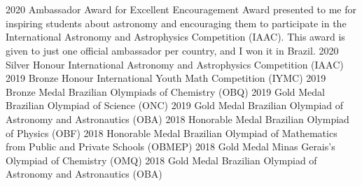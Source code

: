 \documentclass{cv}
\begin{document}
    \section*{}
        \begin{entrylist}
            \entry
                {2020}
                {Ambassador Award for Excellent Encouragement}
                {}
                {Award presented to me for inspiring students about astronomy and encouraging them to participate in the International Astronomy and Astrophysics Competition (IAAC). This award is given to just one official ambassador per country, and I won it in Brazil.}
            \entry
                {2020}
                {Silver Honour}
                {}
                {International Astronomy and Astrophysics Competition (IAAC)}
            \entry
                {2019}
                {Bronze Honour}
                {}
                {International Youth Math Competition (IYMC)}
            \entry
                {2019}
                {Bronze Medal}
                {}
                {Brazilian Olympiads of Chemistry (OBQ)}
            \entry
                {2019}
                {Gold Medal}
                {}
                {Brazilian Olympiad of Science (ONC)}
            \entry
                {2019}
                {Gold Medal}
                {}
                {Brazilian Olympiad of Astronomy and Astronautics (OBA)}
            \entry
                {2018}
                {Honorable Medal}
                {}
                {Brazilian Olympiad of Physics (OBF)}
            \entry
                {2018}
                {Honorable Medal}
                {}
                {Brazilian Olympiad of Mathematics from Public and Private Schools (OBMEP)}
            \entry
                {2018}
                {Gold Medal}
                {}
                {Minas Gerais's Olympiad of Chemistry (OMQ)}
            \entry
                {2018}
                {Gold Medal}
                {}
                {Brazilian Olympiad of Astronomy and Astronautics (OBA)}
        \end{entrylist}
\end{document}
